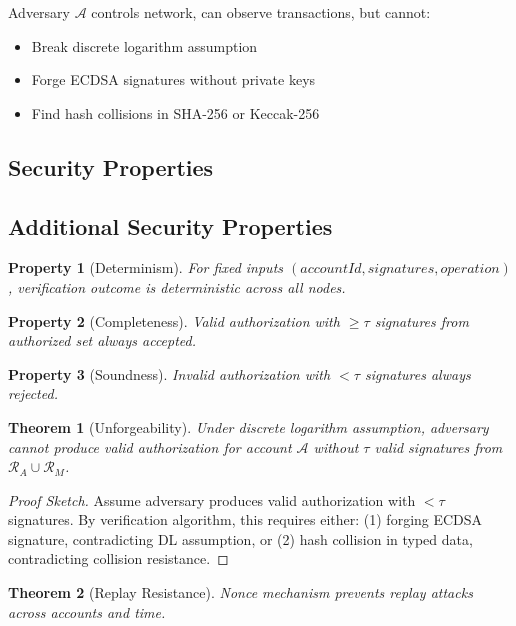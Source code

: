 \documentclass[10pt,twocolumn]{article}
\newtheorem{theorem}{Theorem}
\newtheorem{property}{Property}
\begin{document}
Adversary $\mathcal{A}$ controls network, can observe transactions, but cannot:
\begin{itemize}[leftmargin=*,topsep=2pt,itemsep=1pt]
\item Break discrete logarithm assumption
\item Forge ECDSA signatures without private keys
\item Find hash collisions in SHA-256 or Keccak-256
\end{itemize}

\subsection{Security Properties}

\subsection{Additional Security Properties}

\begin{property}[Determinism]
For fixed inputs $(accountId, signatures, operation)$, verification outcome is deterministic across all nodes.
\end{property}

\begin{property}[Completeness]
Valid authorization with $\geq \tau$ signatures from authorized set always accepted.
\end{property}

\begin{property}[Soundness]
Invalid authorization with $< \tau$ signatures always rejected.
\end{property}


\begin{theorem}[Unforgeability]
Under discrete logarithm assumption, adversary cannot produce valid authorization for account $\mathcal{A}$ without $\tau$ valid signatures from $\mathcal{R}_A \cup \mathcal{R}_M$.
\end{theorem}

\begin{proof}[Proof Sketch]
Assume adversary produces valid authorization with $< \tau$ signatures. By verification algorithm, this requires either: (1) forging ECDSA signature, contradicting DL assumption, or (2) hash collision in typed data, contradicting collision resistance.
\end{proof}

\begin{theorem}[Replay Resistance]
Nonce mechanism prevents replay attacks across accounts and time.
\end{theorem}
\end{document}
